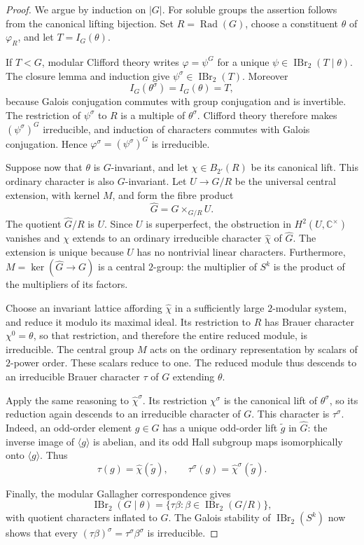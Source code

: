 \documentclass[11pt,a4paper]{amsart}
\theoremstyle{remark}
\numberwithin{equation}{section}
\begin{document}
\begin{proof}
We argue by induction on $|G|$. For soluble groups the assertion follows
from the canonical lifting bijection. Set $R=\operatorname{Rad}(G)$,
choose a constituent $\theta$ of $\varphi_R$, and let
$T=I_G(\theta)$.

If $T<G$, modular Clifford theory writes $\varphi=\psi^G$ for a unique
$\psi\in\operatorname{IBr}_2(T\mid\theta)$. The closure lemma and induction
give $\psi^\sigma\in\operatorname{IBr}_2(T)$. Moreover
\[
I_G(\theta^\sigma)=I_G(\theta)=T,
\]
because Galois conjugation commutes with group conjugation and is invertible.
The restriction of $\psi^\sigma$ to $R$ is a multiple of $\theta^\sigma$.
Clifford theory therefore makes $(\psi^\sigma)^G$ irreducible, and induction
of characters commutes with Galois conjugation. Hence
$\varphi^\sigma=(\psi^\sigma)^G$ is irreducible.

Suppose now that $\theta$ is $G$-invariant, and let
$\chi\in B_{2'}(R)$ be its canonical lift. This ordinary character is also
$G$-invariant. Let $U\to G/R$ be the universal central extension, with
kernel $M$, and form the fibre product
\[
\widehat G=G\times_{G/R}U.
\]
The quotient $\widehat G/R$ is $U$. Since $U$ is superperfect, the obstruction
in $H^2(U,\mathbb C^\times)$ vanishes and $\chi$ extends to an ordinary
irreducible character $\widehat\chi$ of $\widehat G$. The extension is
unique because $U$ has no nontrivial linear characters. Furthermore,
$M=\ker(\widehat G\to G)$ is a central $2$-group: the multiplier of $S^k$
is the product of the multipliers of its factors.

Choose an invariant lattice affording $\widehat\chi$ in a sufficiently large
$2$-modular system, and reduce it modulo its maximal ideal. Its restriction
to $R$ has Brauer character $\chi^0=\theta$, so that restriction, and
therefore the entire reduced module, is irreducible. The central group $M$
acts on the ordinary representation by scalars of $2$-power order. These
scalars reduce to one. The reduced module thus descends to an irreducible
Brauer character $\tau$ of $G$ extending $\theta$.

Apply the same reasoning to $\widehat\chi^\sigma$. Its restriction
$\chi^\sigma$ is the canonical lift of $\theta^\sigma$, so its reduction
again descends to an irreducible character of $G$. This character is
$\tau^\sigma$. Indeed, an odd-order element $g\in G$ has a unique
odd-order lift $\widetilde g$ in $\widehat G$: the inverse image of
$\langle g\rangle$ is abelian, and its odd Hall subgroup maps isomorphically
onto $\langle g\rangle$. Thus
\[
\tau(g)=\widehat\chi(\widetilde g),\qquad
\tau^\sigma(g)=\widehat\chi^\sigma(\widetilde g).
\]

Finally, the modular Gallagher correspondence gives
\[
\operatorname{IBr}_2(G\mid\theta)
 =\{\tau\beta:\beta\in\operatorname{IBr}_2(G/R)\},
\]
with quotient characters inflated to $G$. The Galois stability of
$\operatorname{IBr}_2(S^k)$ now shows that every
$(\tau\beta)^\sigma=\tau^\sigma\beta^\sigma$ is irreducible.
\end{proof}
\end{document}
